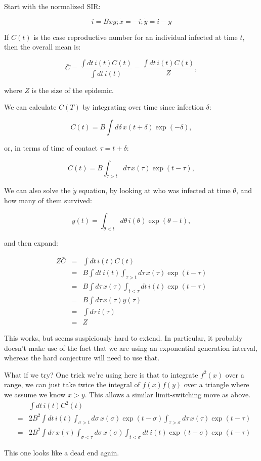 \documentclass[12pt]{article}
\begin{document}
Start with the normalized SIR:

$$ i = Bxy; \dot x = -i; \dot y = i-y $$

If $C(t)$ is the case reproductive number for an individual infected at time $t$, then the overall mean is:

$$
	\bar C 
	= \frac{\int{dt\, i(t) C(t)}}{\int{dt\, i(t)}}
	= \frac{\int{dt\, i(t) C(t)}}{Z}, 
$$

where $Z$ is the size of the epidemic.

We can calculate $C(T)$ by integrating over time since infection $\delta$:

$$C(t) = B \int{d\delta\, x(t+\delta) \exp(-\delta)}, $$

or, in terms of time of contact $\tau=t+\delta$:

$$C(t) = B \int_{\tau>t}{d\tau\, x(\tau) \exp(t-\tau)}, $$

We can also solve the $\dot y$ equation, by looking at who was infected at time $\theta$, and how many of them survived:

$$ y(t) = \int_{\theta<t}{d\theta\, i(\theta)\exp(\theta-t)},$$

and then expand:

\begin{eqnarray}
	Z \bar C
	&=& \int{dt\, i(t) C(t)}
	\\ &=& B \int{dt\, i(t) \int_{\tau>t}{d\tau\, x(\tau) \exp(t-\tau)}}
	\\ &=& B \int{d\tau\, x(\tau) \int_{t<\tau}dt\, i(t) \exp(t-\tau)}
	\\ &=& B \int{d\tau\, x(\tau) y(\tau)}
	\\ &=& \int{d\tau\, i(\tau)}
	\\ &=& Z
\end{eqnarray}

This works, but seems suspiciously hard to extend. In particular, it probably doesn't make use of the fact that we are using an exponential generation interval, whereas the hard conjecture will need to use that.

What if we try? One trick we're using here is that to integrate $f^2(x)$ over a range, we can just take twice the integral of $f(x)f(y)$ over a triangle where we assume we know $x>y$. This allows a similar limit-switching move as above.
\begin{eqnarray}
	&& \int{dt\, i(t) C^2(t)}
	\\ &=& 2B^2 \int{dt\, i(t) \int_{\sigma>t}{d\sigma\, x(\sigma) \exp(t-\sigma)}}
		\int_{\tau>\sigma}{d\tau\, x(\tau) \exp(t-\tau)}
	\\ &=& 2B^2 \int{d\tau\, x(\tau)}
		\int_{\sigma<\tau}{d\sigma\, x(\sigma)}
		\int_{t<\sigma}{dt\, i(t) \exp(t-\sigma) \exp(t-\tau)}
\end{eqnarray}

This one looks like a dead end again.
\end{document}
